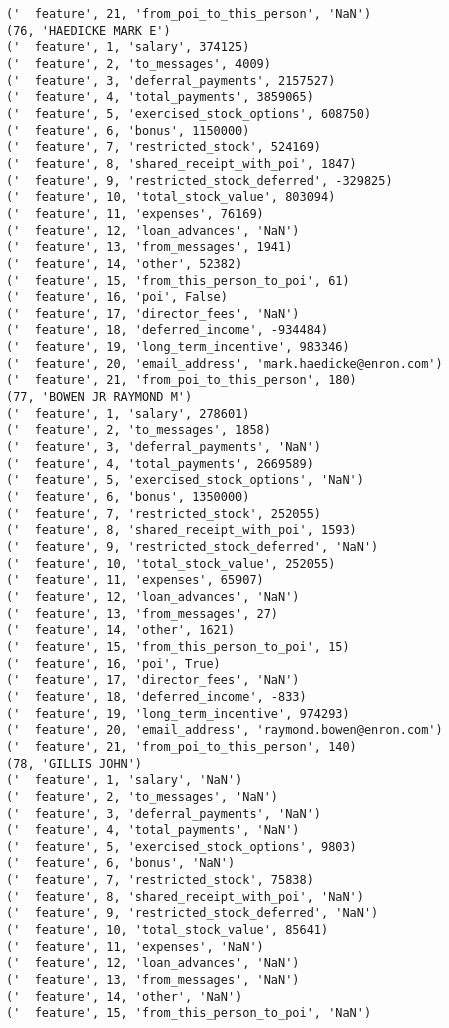 \begin{verbatim}
('  feature', 21, 'from_poi_to_this_person', 'NaN')
(76, 'HAEDICKE MARK E')
('  feature', 1, 'salary', 374125)
('  feature', 2, 'to_messages', 4009)
('  feature', 3, 'deferral_payments', 2157527)
('  feature', 4, 'total_payments', 3859065)
('  feature', 5, 'exercised_stock_options', 608750)
('  feature', 6, 'bonus', 1150000)
('  feature', 7, 'restricted_stock', 524169)
('  feature', 8, 'shared_receipt_with_poi', 1847)
('  feature', 9, 'restricted_stock_deferred', -329825)
('  feature', 10, 'total_stock_value', 803094)
('  feature', 11, 'expenses', 76169)
('  feature', 12, 'loan_advances', 'NaN')
('  feature', 13, 'from_messages', 1941)
('  feature', 14, 'other', 52382)
('  feature', 15, 'from_this_person_to_poi', 61)
('  feature', 16, 'poi', False)
('  feature', 17, 'director_fees', 'NaN')
('  feature', 18, 'deferred_income', -934484)
('  feature', 19, 'long_term_incentive', 983346)
('  feature', 20, 'email_address', 'mark.haedicke@enron.com')
('  feature', 21, 'from_poi_to_this_person', 180)
(77, 'BOWEN JR RAYMOND M')
('  feature', 1, 'salary', 278601)
('  feature', 2, 'to_messages', 1858)
('  feature', 3, 'deferral_payments', 'NaN')
('  feature', 4, 'total_payments', 2669589)
('  feature', 5, 'exercised_stock_options', 'NaN')
('  feature', 6, 'bonus', 1350000)
('  feature', 7, 'restricted_stock', 252055)
('  feature', 8, 'shared_receipt_with_poi', 1593)
('  feature', 9, 'restricted_stock_deferred', 'NaN')
('  feature', 10, 'total_stock_value', 252055)
('  feature', 11, 'expenses', 65907)
('  feature', 12, 'loan_advances', 'NaN')
('  feature', 13, 'from_messages', 27)
('  feature', 14, 'other', 1621)
('  feature', 15, 'from_this_person_to_poi', 15)
('  feature', 16, 'poi', True)
('  feature', 17, 'director_fees', 'NaN')
('  feature', 18, 'deferred_income', -833)
('  feature', 19, 'long_term_incentive', 974293)
('  feature', 20, 'email_address', 'raymond.bowen@enron.com')
('  feature', 21, 'from_poi_to_this_person', 140)
(78, 'GILLIS JOHN')
('  feature', 1, 'salary', 'NaN')
('  feature', 2, 'to_messages', 'NaN')
('  feature', 3, 'deferral_payments', 'NaN')
('  feature', 4, 'total_payments', 'NaN')
('  feature', 5, 'exercised_stock_options', 9803)
('  feature', 6, 'bonus', 'NaN')
('  feature', 7, 'restricted_stock', 75838)
('  feature', 8, 'shared_receipt_with_poi', 'NaN')
('  feature', 9, 'restricted_stock_deferred', 'NaN')
('  feature', 10, 'total_stock_value', 85641)
('  feature', 11, 'expenses', 'NaN')
('  feature', 12, 'loan_advances', 'NaN')
('  feature', 13, 'from_messages', 'NaN')
('  feature', 14, 'other', 'NaN')
('  feature', 15, 'from_this_person_to_poi', 'NaN')

\end{verbatim}
